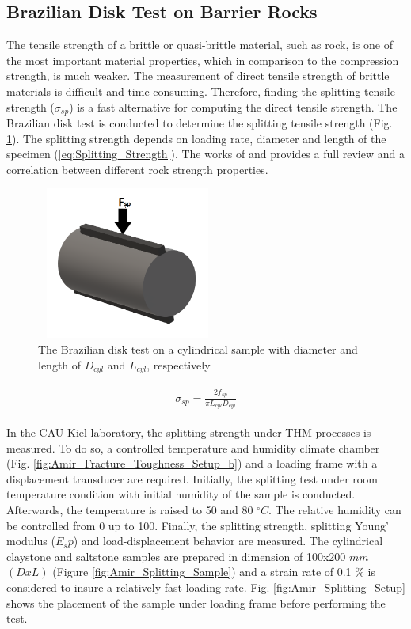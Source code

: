 \subsection{Brazilian Disk Test on Barrier Rocks}
\label{sec:Brazilian_Disk_Exp}

The tensile strength of a brittle or quasi-brittle material, such as rock, is one of the most important material properties, which in comparison to the compression strength, is much weaker. The measurement of direct tensile strength of brittle materials is difficult and time consuming. Therefore, finding the splitting tensile strength ($\sigma_{sp}$) is a fast alternative for computing the direct tensile strength. The Brazilian disk test is conducted to determine the splitting tensile strength (Fig. \ref{fig:Amir_Splitting_Theory}). The splitting strength depends on loading rate, diameter and length of the specimen (\ref{eq:Splitting_Strength}). The works of \cite{Perras2014} and \cite{Li2013} provides a full review and a correlation between different rock strength properties.

\begin{figure}[!ht]
\centering
\includegraphics[width=6cm,height=5cm]{figures/Amir_Splitting_Theory.png}
\caption{The Brazilian disk test on a cylindrical sample with diameter and length of $D_{cyl}$ and $L_{cyl}$, respectively}
\label{fig:Amir_Splitting_Theory}
\end{figure} 

\begin{align}
\label{eq:Splitting_Strength}
\begin{split}
\sigma_{sp}=\frac{2f_{sp}}{\pi L_{cyl}D_{cyl}}
\end{split}
\end{align}

In the CAU Kiel laboratory, the splitting strength under THM processes is measured. To do so, a controlled temperature and humidity climate chamber (Fig. \ref{fig:Amir_Fracture_Toughness_Setup_b}) and a loading frame with a displacement transducer are required. Initially, the splitting test under room temperature condition with initial humidity of the sample is conducted. Afterwards, the temperature is raised to 50 and 80 $^{\circ}C$. The relative humidity can be controlled from 0 up to 100. Finally, the splitting strength, splitting Young’ modulus ($E_sp$) and load-displacement behavior are measured. The cylindrical claystone and saltstone samples are prepared in dimension of 100x200 $mm$ $(DxL)$ (Figure \ref{fig:Amir_Splitting_Sample}) and a strain rate of  0.1 \% is considered to insure a relatively fast loading rate. Fig. \ref{fig:Amir_Splitting_Setup} shows the placement of the sample under loading frame before performing the test.

